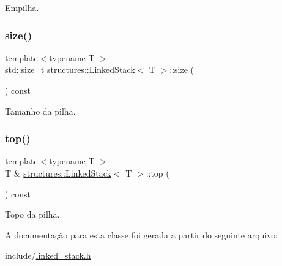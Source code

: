 Empilha. 

\mbox{\label{classstructures_1_1LinkedStack_ae1ca6a5a9b837471863f1c8bb23cfe1d}} 
\subsubsection{\texorpdfstring{size()}{size()}}
{\footnotesize\ttfamily template$<$typename T $>$ \\
std\+::size\+\_\+t \hyperlink{classstructures_1_1LinkedStack}{structures\+::\+Linked\+Stack}$<$ T $>$\+::size (\begin{DoxyParamCaption}{ }\end{DoxyParamCaption}) const}



Tamanho da pilha. 

\mbox{\label{classstructures_1_1LinkedStack_a14ab6e3507dd1206a87bba8c57e1733f}} 
\subsubsection{\texorpdfstring{top()}{top()}}
{\footnotesize\ttfamily template$<$typename T $>$ \\
T \& \hyperlink{classstructures_1_1LinkedStack}{structures\+::\+Linked\+Stack}$<$ T $>$\+::top (\begin{DoxyParamCaption}{ }\end{DoxyParamCaption}) const}



Topo da pilha. 



A documentação para esta classe foi gerada a partir do seguinte arquivo\+:\begin{DoxyCompactItemize}
\item 
include/\hyperlink{linked__stack_8h}{linked\+\_\+stack.\+h}\end{DoxyCompactItemize}
